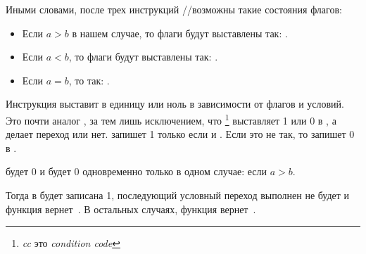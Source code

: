 Иными словами, после трех инструкций \FUCOMPP/\FNSTSW/\SAHF возможны такие состояния флагов:

\begin{itemize}
\item Если $a>b$ в нашем случае, то флаги будут выставлены так: .
\item Если $a<b$, то флаги будут выставлены так: .
\item Если $a=b$, то так: .
\end{itemize}

Инструкция \SETNBE выставит в \AL единицу или ноль в зависимости от флагов и условий. 
Это почти аналог \JNBE, за тем лишь исключением, что \SETcc
\footnote{\emph{cc} это \emph{condition code}}
выставляет 1 или 0 в \AL, а \Jcc делает переход или нет. 
\SETNBE запишет 1 только если  и . Если это не так, то запишет 0 в \AL.

\CF будет 0 и \ZF будет 0 одновременно только в одном случае: если $a>b$.

Тогда в \AL будет записана 1, последующий условный переход \JZ выполнен не будет 
и функция вернет~. 
В остальных случаях, функция вернет~.
